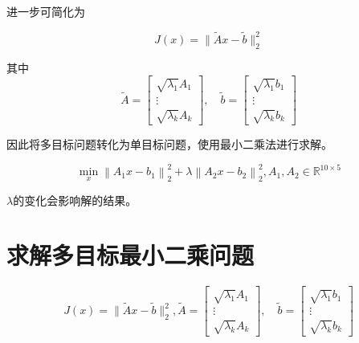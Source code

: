 进一步可简化为

\begin{problem}[加权最小二乘法问题矩阵形式]

    \begin{equation} J(x)=\|\tilde{A} x-\tilde{b}\|_{2}^{2} \end{equation}

其中
\begin{equation}
\tilde{A}=\left[\begin{array}{c}
\sqrt{\lambda_{1}} A_{1} \\
\vdots \\
\sqrt{\lambda_{k}} A_{k}
\end{array}\right], \quad \tilde{b}=\left[\begin{array}{c}
\sqrt{\lambda_{1}} b_{1} \\
\vdots \\
\sqrt{\lambda_{k}} b_{k}
\end{array}\right]
\end{equation}
\end{problem}


因此将多目标问题转化为单目标问题，使用最小二乘法进行求解。

\begin{problem}[双目标规划问题]
    \begin{equation} \min _{x}\left\|A_{1} x-b_{1}\right\|_{2}^{2}+\lambda\left\|A_{2} x-b_{2}\right\|_{2}^{2}, A_{1}, A_{2} \in \mathbb{R}^{10 \times 5} \end{equation}

    $\lambda$的变化会影响解的结果。
\end{problem}


\section{求解多目标最小二乘问题}

\begin{problem}
    \begin{equation}
    J(x)=\|\tilde{A} x-\tilde{b}\|_{2}^{2},
\tilde{A}=\left[\begin{array}{c}
\sqrt{\lambda_{1}} A_{1} \\
\vdots \\
\sqrt{\lambda_{k}} A_{k}
\end{array}\right], \quad \tilde{b}=\left[\begin{array}{c}
\sqrt{\lambda_{1}} b_{1} \\
\vdots \\
\sqrt{\lambda_{k}} b_{k}
\end{array}\right]
\end{equation}

\end{problem}

